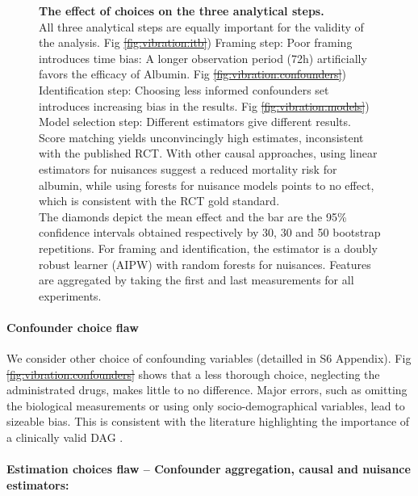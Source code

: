 \documentclass[10pt,letterpaper]{article}
\providecommand{\DIFaddtex}[1]{{\protect\color{blue}\uwave{#1}}} %
\providecommand{\DIFdeltex}[1]{{\protect\color{red}\sout{#1}}}                      %
\providecommand{\DIFaddbegin}{} %
\providecommand{\DIFaddend}{} %
\providecommand{\DIFdelbegin}{} %
\providecommand{\DIFdelend}{} %
\providecommand{\DIFaddFL}[1]{\DIFadd{#1}} %
\providecommand{\DIFdelFL}[1]{\DIFdel{#1}} %
\providecommand{\DIFaddbeginFL}{} %
\providecommand{\DIFaddendFL}{} %
\providecommand{\DIFdelbeginFL}{} %
\providecommand{\DIFdelendFL}{} %
\providecommand{\DIFadd}[1]{\texorpdfstring{\DIFaddtex{#1}}{#1}} %
\providecommand{\DIFdel}[1]{\texorpdfstring{\DIFdeltex{#1}}{}} %
\newcommand{\DIFscaledelfig}{0.5}
\newlength{\DIFdelgraphicswidth} %
\newlength{\DIFdelgraphicsheight} %
\newcommand{\DIFaddincludegraphics}[2][]{{\color{blue}\fbox{\DIFOincludegraphics[#1]{#2}}}} %
\newcommand{\DIFdelincludegraphics}[2][]{%
\sbox{\DIFdelgraphicsbox}{\DIFOincludegraphics[#1]{#2}}%
\settoboxwidth{\DIFdelgraphicswidth}{\DIFdelgraphicsbox} %
\settoboxtotalheight{\DIFdelgraphicsheight}{\DIFdelgraphicsbox} %
\scalebox{\DIFscaledelfig}{%
\parbox[b]{\DIFdelgraphicswidth}{\usebox{\DIFdelgraphicsbox}\\[-\baselineskip] \rule{\DIFdelgraphicswidth}{0em}}\llap{\resizebox{\DIFdelgraphicswidth}{\DIFdelgraphicsheight}{%
\setlength{\unitlength}{\DIFdelgraphicswidth}%
\begin{picture}(1,1)%
\thicklines\linethickness{2pt} %
{\color[rgb]{1,0,0}\put(0,0){\framebox(1,1){}}}%
{\color[rgb]{1,0,0}\put(0,0){\line( 1,1){1}}}%
{\color[rgb]{1,0,0}\put(0,1){\line(1,-1){1}}}%
\end{picture}%
}\hspace*{3pt}}} %
} %
\DeclareRobustCommand{\DIFaddbegin}{\DIFOaddbegin \let\includegraphics\DIFaddincludegraphics} %
\DeclareRobustCommand{\DIFaddend}{\DIFOaddend \let\includegraphics\DIFOincludegraphics} %
\DeclareRobustCommand{\DIFdelbegin}{\DIFOdelbegin \let\includegraphics\DIFdelincludegraphics} %
\DeclareRobustCommand{\DIFdelend}{\DIFOaddend \let\includegraphics\DIFOincludegraphics} %
\DeclareRobustCommand{\DIFaddbeginFL}{\DIFOaddbeginFL \let\includegraphics\DIFaddincludegraphics} %
\DeclareRobustCommand{\DIFaddendFL}{\DIFOaddendFL \let\includegraphics\DIFOincludegraphics} %
\DeclareRobustCommand{\DIFdelbeginFL}{\DIFOdelbeginFL \let\includegraphics\DIFdelincludegraphics} %
\DeclareRobustCommand{\DIFdelendFL}{\DIFOaddendFL \let\includegraphics\DIFOincludegraphics} %
\begin{document}
\begin{figure}[h!]
  \DIFaddendFL \vfill
  \caption{\textbf{The effect of choices on the three
      analytical steps.}\\ All three
    analytical steps are equally important for the validity of the analysis.
    Fig \DIFdelbeginFL \DIFdelFL{\ref{fig:vibration:itb}}\DIFdelendFL \DIFaddbeginFL \DIFaddFL{3a}\DIFaddendFL ) Framing step: Poor framing introduces time bias: A longer
    observation period (72h) artificially favors the efficacy of Albumin.
    Fig \DIFdelbeginFL \DIFdelFL{\ref{fig:vibration:confounders}}\DIFdelendFL \DIFaddbeginFL \DIFaddFL{3b}\DIFaddendFL ) Identification step: Choosing less informed confounders set
    introduces increasing bias in the results. Fig \DIFdelbeginFL \DIFdelFL{\ref{fig:vibration:models}}\DIFdelendFL \DIFaddbeginFL \DIFaddFL{3c}\DIFaddendFL ) Model selection step:
    Different estimators give different results. Score matching yields
    unconvincingly high estimates, inconsistent with the published RCT. With
    other causal approaches, using linear estimators for nuisances suggest a
    reduced mortality risk for albumin, while using forests for nuisance models
    points to no effect, which is consistent with the RCT gold standard.
    \\The diamonds depict the mean effect and the bar are the 95\% confidence
    intervals obtained respectively by 30, 30 and 50 bootstrap repetitions. For
    framing and identification, the estimator is a doubly robust learner (AIPW)
    with random forests for nuisances. Features are aggregated by taking the
    first and last measurements for all experiments.}\label{fig:vibration_analysis}
\end{figure}


\paragraph{Confounder choice flaw} We consider other choice of confounding variables
(detailled in S6 Appendix). Fig
\DIFdelbegin \DIFdel{\ref{fig:vibration:confounders} }\DIFdelend \DIFaddbegin \DIFadd{\ref{fig:vibration_analysis}b) }\DIFaddend shows that a less thorough choice, neglecting
the administrated drugs, makes little to no difference. Major errors, such as
omitting the biological measurements or using only socio-demographical
variables, lead to sizeable bias. This is consistent with the literature
highlighting the importance of a clinically valid DAG \cite{greenland1999causal}.

\paragraph{Estimation choices flaw -- Confounder aggregation, causal and nuisance estimators:}
\end{document}
